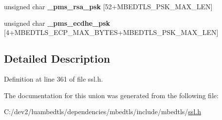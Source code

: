 \begin{DoxyCompactItemize}
\item 
\hypertarget{unionmbedtls__ssl__premaster__secret_a6f84cacb8dfa3313b0fab5c72055c5e1}{unsigned char {\bfseries \-\_\-pms\-\_\-rsa\-\_\-psk} \mbox{[}52+M\-B\-E\-D\-T\-L\-S\-\_\-\-P\-S\-K\-\_\-\-M\-A\-X\-\_\-\-L\-E\-N\mbox{]}}\label{unionmbedtls__ssl__premaster__secret_a6f84cacb8dfa3313b0fab5c72055c5e1}

\item 
\hypertarget{unionmbedtls__ssl__premaster__secret_a118de301deea6334c6ddc5338e828251}{unsigned char {\bfseries \-\_\-pms\-\_\-ecdhe\-\_\-psk} \mbox{[}4+M\-B\-E\-D\-T\-L\-S\-\_\-\-E\-C\-P\-\_\-\-M\-A\-X\-\_\-\-B\-Y\-T\-E\-S+M\-B\-E\-D\-T\-L\-S\-\_\-\-P\-S\-K\-\_\-\-M\-A\-X\-\_\-\-L\-E\-N\mbox{]}}\label{unionmbedtls__ssl__premaster__secret_a118de301deea6334c6ddc5338e828251}

\end{DoxyCompactItemize}


\subsection{Detailed Description}


Definition at line 361 of file ssl.\-h.



The documentation for this union was generated from the following file\-:\begin{DoxyCompactItemize}
\item 
C\-:/dev2/luambedtls/dependencies/mbedtls/include/mbedtls/\hyperlink{ssl_8h}{ssl.\-h}\end{DoxyCompactItemize}
